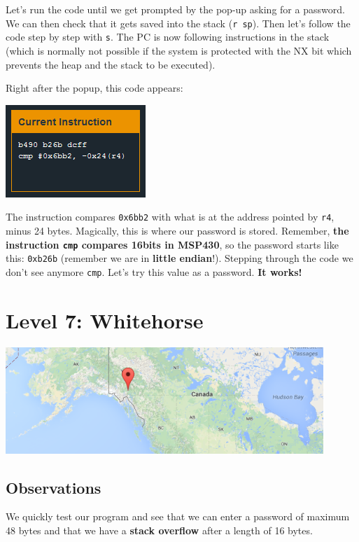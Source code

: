 \documentclass[a4paper,11pt]{article}
\begin{document}
Let's run the code until we get prompted by the pop-up asking for a
password. We can then check that it gets saved into the stack
(\texttt{r sp}). Then let's follow the code step by step with
\texttt{s}. The PC is now following instructions in the stack (which is
normally not possible if the system is protected with the NX bit which
prevents the heap and the stack to be executed).

Right after the popup, this code appears:

\includegraphics{img/6_2.PNG}

The instruction compares \texttt{0x6bb2} with what is at the address
pointed by \texttt{r4}, minus 24 bytes. Magically, this is where our
password is stored. Remember, \textbf{the instruction \texttt{cmp}
compares 16bits in MSP430}, so the password starts like this:
\texttt{0xb26b} (remember we are in \textbf{little endian}!). Stepping
through the code we don't see anymore \texttt{cmp}. Let's try this value
as a password. \textbf{It works!}

\section{Level 7: Whitehorse}\label{level-7-whitehorse}

\includegraphics{img/7_1.PNG}

\subsection{Observations}\label{observations-3}

We quickly test our program and see that we can enter a password of
maximum 48 bytes and that we have a \textbf{stack overflow} after a
length of 16 bytes.
\end{document}
